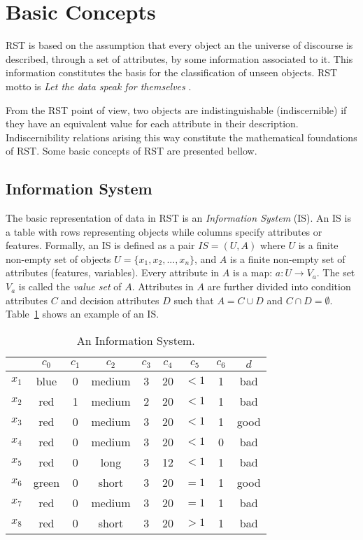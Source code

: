 \documentclass[authoryear,preprint,review,12pt]{elsarticle}
\begin{document}
\section{Basic Concepts}\label{basicConcepts}
  RST is based on the assumption that every object an the universe of discourse is described, through a 
  set of attributes, by some information associated to it. This information constitutes the basis for the
  classification of unseen objects. RST motto is \textit{Let the data speak for themselves} \citep{Tiwari14}.
  
  From the RST point of view, two objects are indistinguishable (indiscernible) if they have an equivalent 
  value for each attribute in their description. Indiscernibility relations arising this way constitute the
  mathematical foundations of RST. 
  Some basic concepts of RST are presented bellow.
  
\subsection{Information System}
  The basic representation of data in RST is an \emph{Information System} (IS). An IS is a table with rows
  representing objects while columns specify attributes or features. Formally, an IS is defined as a pair
  $IS=(U,A)$ where $U$ is a finite non-empty set of objects $U=\lbrace x_1,x_2,...,x_n\rbrace$, and $A$ is a 
  finite non-empty set
  of attributes (features, variables). Every attribute in $A$ is a map: $a: U \rightarrow V_a$. The set $V_a$ is
  called the \textit{value set} of $A$. Attributes in $A$ are further divided into condition attributes $C$ and 
  decision attributes $D$ such that $A=C \cup D$ and $C \cap D =\emptyset$. 
  Table~\ref{tab_IS} shows an example of an IS.
  
  
 \begin{table}[htb]
		\caption{An Information System.} \label{tab_IS}
		\centering
 	\begin{tabular}{c||c|c|c|c|c|c|c||c}
 			  & $c_0$ & $c_1$ & $c_2$ &  $c_3$ & $c_4$ & $c_5$ &  $c_6$ & $d$ \\
 		\hline \hline
		$x_1$ &   blue  & 0 & medium & 3 & 20 & $<1$  & 1 & bad   \\
		$x_2$ &   red   & 1 & medium & 2 & 20 & $<1$  & 1 & bad   \\
		$x_3$ &   red   & 0 & medium & 3 & 20 & $<1$  & 1 & good   \\
		$x_4$ &   red   & 0 & medium & 3 & 20 & $<1$  & 0 & bad   \\
		$x_5$ &   red   & 0 & long   & 3 & 12 & $<1$  & 1 & bad   \\
		$x_6$ &   green & 0 & short  & 3 & 20 & $=1$  & 1 & good   \\
		$x_7$ &   red   & 0 & medium & 3 & 20 & $=1$  & 1 & bad   \\
		$x_8$ &   red   & 0 & short  & 3 & 20 & $>1$  & 1 & bad   \\
 	\end{tabular}             
 \end{table}
 
\end{document}
